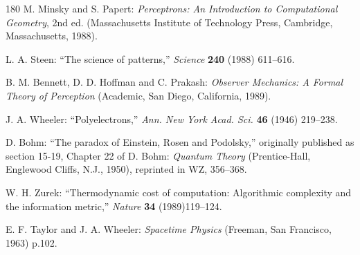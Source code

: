 \documentclass[11pt]{article}
\begin{document}
\begin{thebibliography}{180}
		M. Minsky and S. Papert: \emph{Perceptrons: An Introduction to Computational Geometry}, 2nd ed. (Massachusetts Institute of Technology Press, Cambridge, Massachusetts, 1988).
		
		L. A. Steen: ``The science of patterns,'' \emph{Science} \textbf{240} (1988) 611--616.
		
		B. M. Bennett, D. D. Hoffman and C. Prakash: \emph{Observer Mechanics: A Formal Theory of Perception} (Academic, San Diego, California, 1989).
		
		J. A. Wheeler: ``Polyelectrons,'' \emph{Ann. New York Acad. Sci.} \textbf{46} (1946) 219--238.
		
		D. Bohm: ``The paradox of Einstein, Rosen and Podolsky,'' originally published as section 15-19, Chapter 22 of D. Bohm: \emph{Quantum Theory} (Prentice-Hall, Englewood Cliffs, N.J., 1950), reprinted in WZ, 356--368.
		
		W. H. Zurek: ``Thermodynamic cost of computation: Algorithmic complexity and the information metric,'' \emph{Nature} \textbf{34} (1989)119--124.
		
		E. F. Taylor and J. A. Wheeler: \emph{Spacetime Physics} (Freeman, San Francisco, 1963) p.102.
		
	\end{thebibliography}
\end{document}
